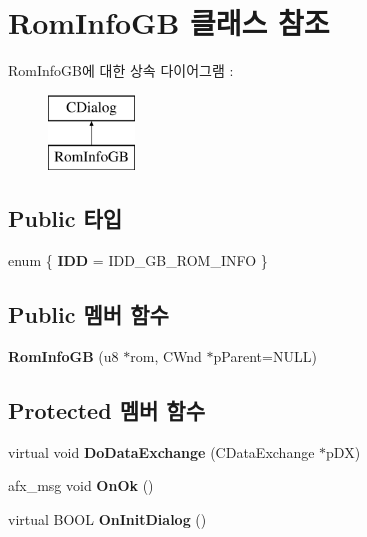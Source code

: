 \hypertarget{class_rom_info_g_b}{}\section{Rom\+Info\+GB 클래스 참조}
\label{class_rom_info_g_b}
Rom\+Info\+G\+B에 대한 상속 다이어그램 \+: \begin{figure}[H]
\begin{center}
\leavevmode
\includegraphics[height=2.000000cm]{class_rom_info_g_b}
\end{center}
\end{figure}
\subsection*{Public 타입}
\begin{DoxyCompactItemize}
\item 
\mbox{\label{class_rom_info_g_b_a064c2e7a699087424ed18892356145f5}} 
enum \{ {\bfseries I\+DD} = I\+D\+D\+\_\+\+G\+B\+\_\+\+R\+O\+M\+\_\+\+I\+N\+FO
 \}
\end{DoxyCompactItemize}
\subsection*{Public 멤버 함수}
\begin{DoxyCompactItemize}
\item 
\mbox{\label{class_rom_info_g_b_a89d8213c4f8c05b76fdf395757a51cef}} 
{\bfseries Rom\+Info\+GB} (u8 $\ast$rom, C\+Wnd $\ast$p\+Parent=N\+U\+LL)
\end{DoxyCompactItemize}
\subsection*{Protected 멤버 함수}
\begin{DoxyCompactItemize}
\item 
\mbox{\label{class_rom_info_g_b_aff85d9d0011b4b73cdf3ed85ecf64ff8}} 
virtual void {\bfseries Do\+Data\+Exchange} (C\+Data\+Exchange $\ast$p\+DX)
\item 
\mbox{\label{class_rom_info_g_b_a1d2f685c9b4215ff9dae328e90777312}} 
afx\+\_\+msg void {\bfseries On\+Ok} ()
\item 
\mbox{\label{class_rom_info_g_b_a91b078804aeeca8f6bc23479b1b3e839}} 
virtual B\+O\+OL {\bfseries On\+Init\+Dialog} ()
\end{DoxyCompactItemize}
